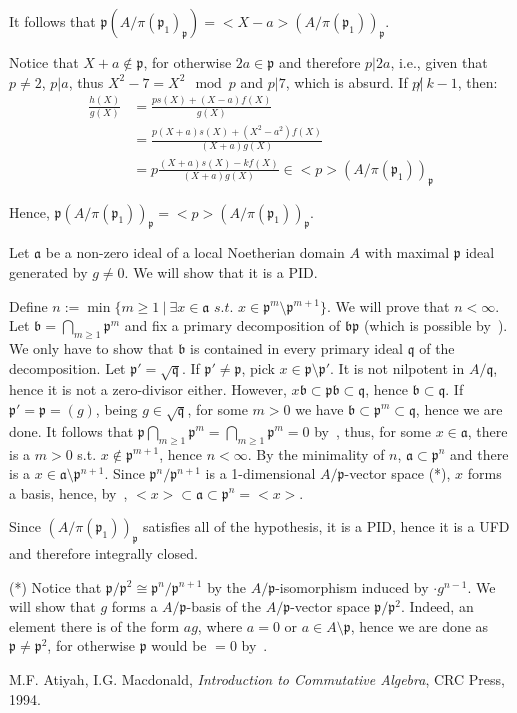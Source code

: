 \documentclass{article}
\newcommand{\aid}{\mathfrak{a}}
\newcommand{\bid}{\mathfrak{b}}
\newcommand{\pid}{\mathfrak{p}}
\newcommand{\qid}{\mathfrak{q}}
\begin{document}
It follows that $\pid (A/\pi(\pid_1)_{\pid})=<X-a>(A/\pi(\pid_1))_{\pid}$.

Notice that $X+a\not\in\pid$, for otherwise $2a\in\pid$ and therefore $p|2a$, i.e., given that $p\neq 2$, $p|a$, thus $X^2-7=X^2\mod p$ and $p|7$, which is absurd. If $p\not |\ k-1$, then:
\begin{align*}
  \frac{h(X)}{g(X)} & = \frac{ps(X)+(X-a)f(X)}{g(X)} \\
  & = \frac{p(X+a)s(X)+(X^2-a^2)f(X)}{(X+a)g(X)} \\
  & = p\frac{(X+a)s(X)-kf(X)}{(X+a)g(X)}\in <p>(A/\pi(\pid_1))_{\pid}
\end{align*}

Hence, $\pid (A/\pi(\pid_1))_{\pid}=<p>(A/\pi(\pid_1))_{\pid}$.

Let $\aid$ be a non-zero ideal of a local Noetherian domain $A$ with maximal $\pid$ ideal generated by $g\neq 0$. We will show that it is a PID.

Define $n:=\min \{m\geq 1\ |\ \exists x\in\aid\textit{ s.t. } x\in\pid^m\setminus\pid^{m+1}\}$. We will prove that $n<\infty$. Let $\bid=\bigcap_{m\geq 1}\pid^m$ and fix a primary decomposition of $\bid\pid$ (which is possible by~\cite[thm. 7.13]{atm}). We only have to show that $\bid$ is contained in every primary ideal $\qid$ of the decomposition. Let $\pid'=\sqrt{\qid}$. If $\pid'\neq\pid$, pick $x\in\pid\setminus\pid'$. It is not nilpotent in $A/\qid$, hence it is not a zero-divisor either. However, $x\bid\subset\pid\bid\subset\qid$, hence $\bid\subset\qid$. If $\pid'=\pid=(g)$, being $g\in\sqrt{\qid}$, for some $m>0$ we have $\bid\subset\pid^m\subset\qid$, hence we are done. It follows that $\pid\bigcap_{m\geq 1}\pid^m=\bigcap_{m\geq 1}\pid^m=0$ by~\cite[prop. 2.6]{atm}, thus, for some $x\in\aid$, there is a $m>0$ s.t. $x\not\in\pid^{m+1}$, hence $n<\infty$. By the minimality of $n$, $\aid\subset\pid^n$ and there is a $x\in\aid\setminus\pid^{n+1}$. Since $\pid^n/\pid^{n+1}$ is a 1-dimensional $A/\pid$-vector space (*), $x$ forms a basis, hence, by~\cite[cor. 2.7]{atm}, $<x>\subset\aid\subset\pid^n=<x>$.

Since $(A/\pi(\pid_1))_{\pid}$ satisfies all of the hypothesis, it is a PID, hence it is a UFD and therefore integrally closed.

(*) Notice that $\pid/\pid^2\cong\pid^n/\pid^{n+1}$ by the $A/\pid$-isomorphism induced by $\cdot g^{n-1}$. We will show that $g$ forms a $A/\pid$-basis of the $A/\pid$-vector space $\pid/\pid^2$. Indeed, an element there is of the form $ag$, where $a=0$ or $a\in A\setminus\pid$, hence we are done as $\pid\neq\pid^2$, for otherwise $\pid$ would be $=0$ by~\cite[prop. 2.6]{atm}.








\begin{thebibliography}{9}
		M.F. Atiyah, I.G. Macdonald,
		\textit{Introduction to Commutative Algebra},
		CRC Press,
		1994.
\end{thebibliography}
\end{document}

